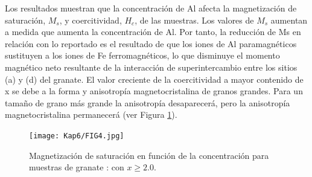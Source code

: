 Los resultados muestran que la concentración de Al afecta la magnetización de
saturación, $M_s$, y coercitividad, $H_c$, de las muestras. Los valores de
$M_s$
aumentan a medida que aumenta la concentración de Al. Por tanto, la reducción
de Ms en relación con lo reportado es el resultado de que los iones de Al
paramagnéticos sustituyen a los iones de Fe ferromagnéticos, lo que disminuye
el momento magnético neto resultante de la interacción de superintercambio
entre los sitios (a) y (d) del granate. El valor creciente de la coercitividad
a mayor contenido de x se debe a la forma y anisotropía magnetocristalina de
granos grandes. Para un tamaño de grano más grande la anisotropía desaparecerá,
pero la anisotropía magnetocristalina permanecerá \cite{hapishah2017phase} (ver Figura
\ref{fig:mr}).\\

\begin{figure}[t]
  \centering%

  \texttt{[image: Kap6/FIG4.jpg]}%
  \caption{Magnetización de saturación en función de la concentración para muestras de granate : con $x \geq 2.0$.}
  \label{fig:mr}
\end{figure}
